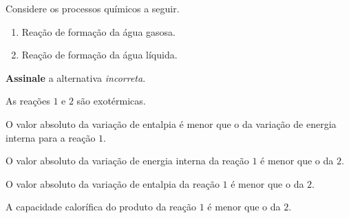\documentclass[braun, twocolumn]{braun}
\begin{document}
\begin{problem}
[2A35]Considere os processos químicos a seguir.

\begin{enumerate}
\def\labelenumi{\arabic{enumi}.}

\item
  Reação de formação da água gasosa.
\item
  Reação de formação da água líquida.
\end{enumerate}

\textbf{Assinale} a alternativa \emph{incorreta}.


\begin{choices}

\item As reações \(1\) e \(2\) são exotérmicas.

\item O valor absoluto da variação de entalpia é menor que o da variação de
energia interna para a reação \(1\).

\item O valor absoluto da variação de energia interna da reação \(1\) é menor
que o da \(2\).

\item O valor absoluto da variação de entalpia da reação \(1\) é menor que o
da \(2\).

\item A capacidade calorífica do produto da reação \(1\) é menor que o da
\(2\).

\end{choices}

\end{problem}
\end{document}
